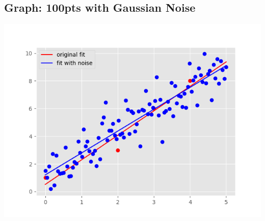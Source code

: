 \documentclass{article}
\begin{document}
    \subsection{Graph: 100pts with Gaussian Noise}
        \includegraphics{hw1pr2d.png}
\end{document}
